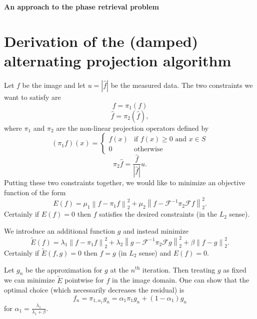 \documentclass[10pt]{article}
\begin{document}
%

\def\spacingset#1{\renewcommand{\baselinestretch}%
{#1}\small\normalsize} \spacingset{1}

\newcommand\norm[1]{\left\lVert#1\right\rVert}


  \bigskip
  \bigskip
  \bigskip
  \begin{center}
    {\LARGE\bf An approach to the phase retrieval problem}
  \end{center}
  \medskip


\bigskip
\begin{abstract}

\end{abstract}

\section {Derivation of the (damped) alternating projection algorithm}

Let $f$ be the image and let $u=|\hat{f}|$ be the measured data. The two constraints we want to satisfy are
$$f=\pi_1(f)$$
$$\hat{f}=\pi_2(\hat{f}),$$
where $\pi_1$ and $\pi_2$ are the non-linear projection operators defined by
$$
(\pi_1 f)(x)=\begin{cases}
f(x) & \text{if }f(x)\geq 0 \text{ and } x\in S \\
0 & \text{otherwise}
\end{cases}
$$
$$
\pi_2\hat{f}=\frac{\hat{f}}{|\hat{f}|}u.
$$
Putting these two constraints together, we would like to minimize an objective function of the form
$$
E(f)=\mu_1\norm{f-\pi_1 f}_2^2 + \mu_2\norm{f-\mathscr{F}^{-1}\pi_2\mathscr{F} f}_2^2.
$$
Certainly if $E(f)=0$ then $f$ satisfies the desired constraints (in the $L_2$ sense).

We introduce an additional function $g$ and instead minimize
$$
\tilde{E}(f)=
\lambda_1\norm{f-\pi_1 f}_2^2 + \lambda_2\norm{g-\mathscr{F}^{-1}\pi_2\mathscr{F} g}_2^2 + \beta\norm{f-g}_2^2.
$$
Certainly if $\tilde{E}(f,g)=0$ then $f=g$ (in $L_2$ sense) and $E(f)=0$.

Let $g_n$ be the approximation for $g$ at the $n^{\text{th}}$ iteration. Then treating $g$ as fixed we can minimize $\tilde{E}$ pointwise for $f$ in the image domain. One can show that the optimal choice (which necessarily decreases the residual) is 
$$f_n = \pi_{1,\alpha_1}g_n=\alpha_1\pi_1 g_n + (1-\alpha_1)g_n$$
for $\alpha_1=\frac{\lambda_1}{\lambda_1+\beta}$.
\end{document}
